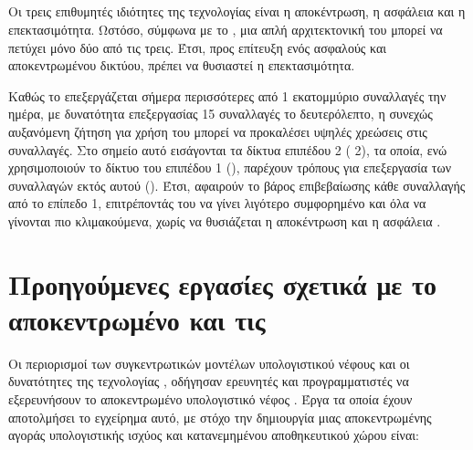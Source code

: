\subsection{}
Οι τρεις επιθυμητές ιδιότητες της τεχνολογίας  είναι η αποκέντρωση, η ασφάλεια και η επεκτασιμότητα. Ωστόσο, σύμφωνα με το  \cite{ref23}, μια απλή αρχιτεκτονική του μπορεί να πετύχει μόνο δύο από τις τρεις. Έτσι, προς επίτευξη ενός ασφαλούς και αποκεντρωμένου δικτύου, πρέπει να θυσιαστεί η επεκτασιμότητα. 

Καθώς το  επεξεργάζεται σήμερα περισσότερες από 1 εκατομμύριο συναλλαγές την ημέρα, με δυνατότητα επεξεργασίας 15 συναλλαγές το δευτερόλεπτο, η συνεχώς αυξανόμενη ζήτηση για χρήση του μπορεί να προκαλέσει υψηλές χρεώσεις στις συναλλαγές.
Στο σημείο αυτό εισάγονται τα δίκτυα επιπέδου 2 ( 2), τα οποία, ενώ χρησιμοποιούν το δίκτυο του επιπέδου 1 (), παρέχουν τρόπους για επεξεργασία των συναλλαγών εκτός αυτού (). Έτσι, αφαιρούν το βάρος επιβεβαίωσης κάθε συναλλαγής από το επίπεδο 1, επιτρέποντάς του να γίνει λιγότερο συμφορημένο και όλα να γίνονται πιο κλιμακούμενα, χωρίς να θυσιάζεται η αποκέντρωση και η ασφάλεια \cite{ref24}. 



\section{Προηγούμενες εργασίες σχετικά με το αποκεντρωμένο  και τις }
Οι περιορισμοί των συγκεντρωτικών μοντέλων υπολογιστικού νέφους και οι 
δυνατότητες της τεχνολογίας , οδήγησαν ερευνητές και 
προγραμματιστές να εξερευνήσουν το αποκεντρωμένο υπολογιστικό νέφος \cite{ref25,ref26,ref27,ref28,ref29,ref30}. Έργα τα οποία έχουν αποτολμήσει το εγχείρημα αυτό, με στόχο την δημιουργία μιας 
αποκεντρωμένης αγοράς υπολογιστικής ισχύος και κατανεμημένου αποθηκευτικού 
χώρου είναι:

